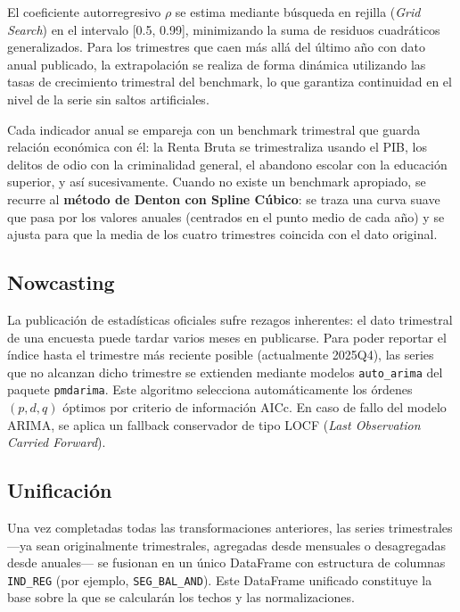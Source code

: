 \documentclass[12pt,a4paper]{article}
\begin{document}
El coeficiente autorregresivo $\rho$ se estima mediante búsqueda en rejilla (\textit{Grid Search}) en el intervalo [0.5, 0.99], minimizando la suma de residuos cuadráticos generalizados. Para los trimestres que caen más allá del último año con dato anual publicado, la extrapolación se realiza de forma dinámica utilizando las tasas de crecimiento trimestral del benchmark, lo que garantiza continuidad en el nivel de la serie sin saltos artificiales.

Cada indicador anual se empareja con un benchmark trimestral que guarda relación económica con él: la Renta Bruta se trimestraliza usando el PIB, los delitos de odio con la criminalidad general, el abandono escolar con la educación superior, y así sucesivamente. Cuando no existe un benchmark apropiado, se recurre al \textbf{método de Denton con Spline Cúbico}: se traza una curva suave que pasa por los valores anuales (centrados en el punto medio de cada año) y se ajusta para que la media de los cuatro trimestres coincida con el dato original. 

\subsection{Nowcasting}

La publicación de estadísticas oficiales sufre rezagos inherentes: el dato trimestral de una encuesta puede tardar varios meses en publicarse. Para poder reportar el índice hasta el trimestre más reciente posible (actualmente 2025Q4), las series que no alcanzan dicho trimestre se extienden mediante modelos \texttt{auto\_arima} del paquete \texttt{pmdarima}. Este algoritmo selecciona automáticamente los órdenes $(p,d,q)$ óptimos por criterio de información AICc. En caso de fallo del modelo ARIMA, se aplica un fallback conservador de tipo LOCF (\textit{Last Observation Carried Forward}).

\subsection{Unificación}

Una vez completadas todas las transformaciones anteriores, las series trimestrales ---ya sean originalmente trimestrales, agregadas desde mensuales o desagregadas desde anuales--- se fusionan en un único DataFrame con estructura de columnas \texttt{IND\_REG} (por ejemplo, \texttt{SEG\_BAL\_AND}). Este DataFrame unificado constituye la base sobre la que se calcularán los techos y las normalizaciones.
\end{document}
